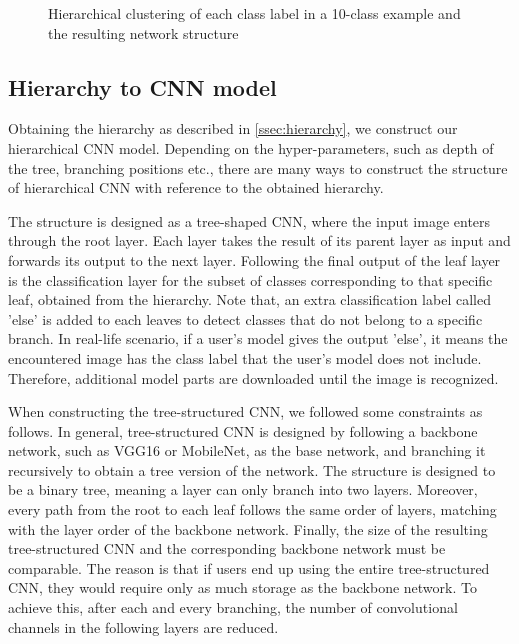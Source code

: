 \begin{figure}
\begin{minipage}[b]{.4\textwidth}
        \label{fig:sub2}
    \end{minipage}
    \caption{Hierarchical clustering of each class label in a 10-class example and the resulting network structure}
    \label{fig:hierarchy}
\end{figure}

\subsection{Hierarchy to CNN model}
\label{ssec:hiertoCNN}

Obtaining the hierarchy as described in \ref{ssec:hierarchy}, we construct our hierarchical CNN model. Depending on the hyper-parameters, such as depth of the tree, branching positions etc., there are many ways to construct the structure of hierarchical CNN with reference to the obtained hierarchy.

The structure is designed as a tree-shaped CNN, where the input image enters through the root layer.
Each layer takes the result of its parent layer as input and forwards its output to the next layer. 
Following the final output of the leaf layer is the classification layer for the subset of classes corresponding to that specific leaf, obtained from the hierarchy.
Note that, an extra classification label called 'else' is added to each leaves to detect classes that do not belong to a specific branch.
In real-life scenario, if a user's model gives the output 'else', it means the encountered image has the class label that the user's model does not include.  
Therefore, additional model parts are downloaded until the image is recognized.

When constructing the tree-structured CNN, we followed some constraints as follows. 
In general, tree-structured CNN is designed by following a backbone network, such as VGG16 or MobileNet, as the base network, and branching it recursively to obtain a tree version of the network.
The structure is designed to be a binary tree, meaning a layer can only branch into two layers. 
Moreover, every path from the root to each leaf follows the same order of layers, matching with the layer order of the backbone network.
Finally, the size of the resulting tree-structured CNN and the corresponding backbone network must be comparable. 
The reason is that if users end up using the entire tree-structured CNN, they would require only as much storage as the backbone network.
To achieve this, after each and every branching, the number of convolutional channels in the following layers are reduced.


